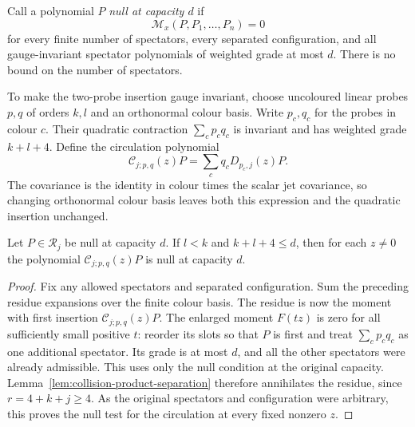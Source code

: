 Call a polynomial $P$ \emph{null at capacity $d$} if
\[
 \mathcal M_x(P,P_1,\ldots,P_n)=0
\]
for every finite number of spectators, every separated configuration,
and all gauge-invariant spectator polynomials of weighted grade at
most $d$. There is no bound on the number of spectators.

To make the two-probe insertion gauge invariant, choose uncoloured
linear probes $p,q$ of orders $k,l$ and an orthonormal colour basis.
Write $p_c,q_c$ for the probes in colour $c$. Their quadratic contraction
$\sum_c p_cq_c$ is invariant and has weighted grade $k+l+4$.
Define the circulation polynomial
\[
 \mathcal C_{j;p,q}(z)P=\sum_c q_cD_{p_c,j}(z)P.
\]
The covariance is the identity in colour times the scalar jet
covariance, so changing orthonormal colour basis leaves both this
expression and the quadratic insertion unchanged.

\begin{theorem}
\label{thm:free-circulation-null}
Let $P\in\mathcal R_j$ be null at capacity $d$. If $l<k$ and
$k+l+4\leq d$, then for each $z\ne0$ the polynomial
$\mathcal C_{j;p,q}(z)P$ is null at capacity $d$.
\end{theorem}

\begin{proof}
Fix any allowed spectators and separated configuration. Sum the
preceding residue expansions over the finite colour basis. The residue
is now the moment with first insertion $\mathcal C_{j;p,q}(z)P$.
The enlarged moment $F(tz)$ is zero for all sufficiently small positive
$t$: reorder its slots so that $P$ is first and treat
$\sum_c p_cq_c$ as one additional spectator. Its grade is at most $d$,
and all the other spectators were already admissible. This uses only
the null condition at the original capacity.
Lemma~\ref{lem:collision-product-separation} therefore annihilates
the residue, since $r=4+k+j\geq4$. As the original spectators and
configuration were arbitrary, this proves the null test for the
circulation at every fixed nonzero $z$.
\end{proof}
